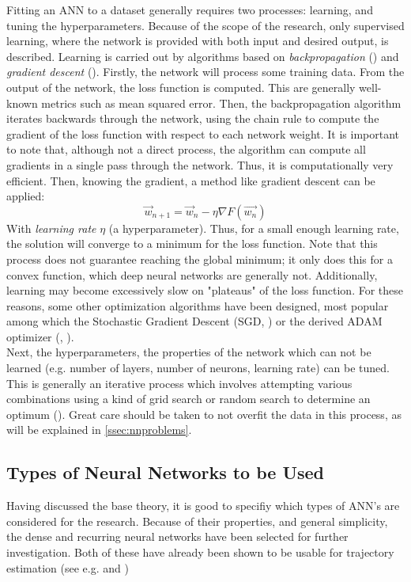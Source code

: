 Fitting an ANN to a dataset generally requires two processes: learning, and tuning the hyperparameters. Because of the scope of the research, only supervised learning, where the network is provided with both input and desired output, is described. Learning is carried out by algorithms based on  \textit{backpropagation} (\cite{nnbookthree}) and \textit{gradient descent} (\cite{gradientdescent}). Firstly, the network will process some training data. From the output of the network, the loss function is computed. This are generally well-known metrics such as mean squared error. Then, the backpropagation algorithm iterates backwards through the network, using the chain rule to compute the gradient of the loss function with respect to each network weight. It is important to note that, although not a direct process, the algorithm can compute all gradients in a single pass through the network. Thus, it is computationally very efficient. Then, knowing the gradient, a method like gradient descent can be applied:
\begin{equation}
    \vec{w}_{n+1} = \vec{w}_n - \eta \nabla F(\vec{w_n})
\end{equation}
With \textit{learning rate} $\eta$ (a hyperparameter). Thus, for a small enough learning rate, the solution will converge to a minimum for the loss function. Note that this process does not guarantee reaching the global minimum; it only does this for a convex function, which deep neural networks are generally not. Additionally, learning may become excessively slow on "plateaus" of the loss function. For these reasons, some other optimization algorithms have been designed, most popular among which the Stochastic Gradient Descent (SGD, \cite{sgd}) or the derived ADAM optimizer (\cite{Adam}, \cite{AdamKeras}). \\

Next, the hyperparameters, the properties of the network which can not be learned (e.g. number of layers, number of neurons, learning rate) can be tuned. This is generally an iterative process which involves attempting various combinations using a kind of grid search or random search to determine an optimum (\cite{nnbooktwo}). Great care should be taken to not overfit the data in this process, as will be explained in \autoref{ssec:nnproblems}.

\subsection{Types of Neural Networks to be Used}
Having discussed the base theory, it is good to specifiy which types of ANN's are considered for the research. Because of their properties, and general simplicity, the dense and recurring neural networks have been selected for further investigation. Both of these have already been shown to be usable for trajectory estimation (see e.g. \cite{anntrajectoryone} and \cite{anntrajectorytwo})\\


